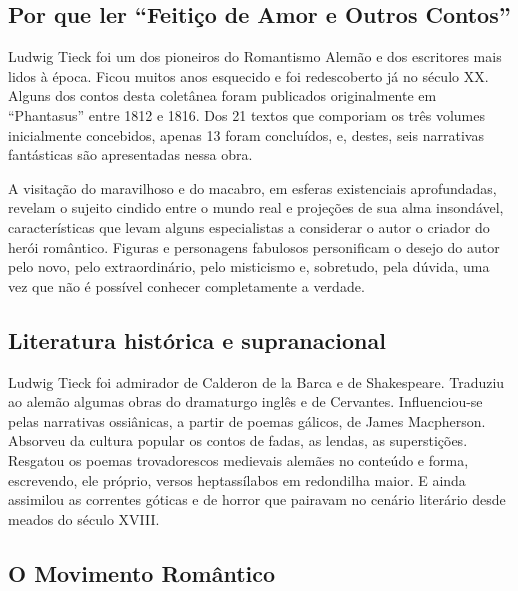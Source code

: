 \documentclass[12pt]{extarticle}
\begin{document}
\subsection{Por que ler ``Feitiço de Amor e Outros Contos''}

Ludwig Tieck foi um dos pioneiros do Romantismo Alemão e dos escritores
mais lidos à época. Ficou muitos anos esquecido e foi redescoberto já no
século XX. Alguns dos contos desta coletânea foram publicados
originalmente em ``Phantasus'' entre 1812 e 1816. Dos 21 textos que
comporiam os três volumes inicialmente concebidos, apenas 13 foram
concluídos, e, destes, seis narrativas fantásticas são apresentadas
nessa obra.

A visitação do maravilhoso e do macabro, em esferas existenciais
aprofundadas, revelam o sujeito cindido entre o mundo real e projeções
de sua alma insondável, características que levam alguns especialistas a
considerar o autor o criador do herói romântico. Figuras e personagens
fabulosos personificam o desejo do autor pelo novo, pelo extraordinário,
pelo misticismo e, sobretudo, pela dúvida, uma vez que não é possível
conhecer completamente a verdade.


\subsection{Literatura histórica e supranacional}

Ludwig Tieck foi admirador de Calderon de la Barca e de Shakespeare.
Traduziu ao alemão algumas obras do dramaturgo inglês e de Cervantes.
Influenciou-se pelas narrativas ossiânicas, a partir de poemas gálicos,
de James Macpherson. Absorveu da cultura popular os contos de fadas, as
lendas, as superstições. Resgatou os poemas trovadorescos medievais
alemães no conteúdo e forma, escrevendo, ele próprio, versos
heptassílabos em redondilha maior. E ainda assimilou as correntes
góticas e de horror que pairavam no cenário literário desde meados do
século XVIII.

\subsection{O Movimento Romântico}
\end{document}
